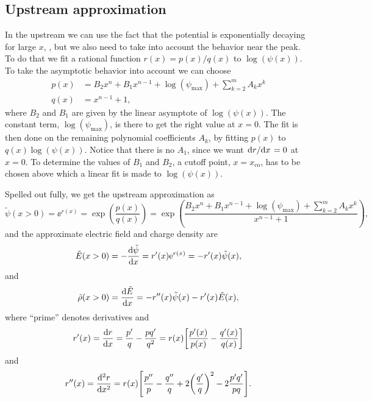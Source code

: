 \documentclass[11pt,a4paper, 
swedish, english %
]{article}
\begin{document}
\subsection{Upstream approximation}
In the upstream we can use the fact that the potential is
exponentially decaying for large $x$, , but we
also need to take into account the behavior near the peak.
To do that we fit a rational function $r(x)=p(x)/q(x)$ to
$\log(\psi(x))$. To take the asymptotic behavior into account we can
choose
\begin{equation}\label{eq:pq}
\begin{aligned}
p(x)&= B_2x^n+B_1x^{n-1} + \log(\psi_{\max}) + \sum_{k=2}^{m}A_kx^k\\
q(x)&= x^{n-1}+1,
\end{aligned}
\end{equation}
where $B_2$ and $B_1$ are given by the linear asymptote of
$\log(\psi(x))$. The constant term, $\log(\psi_{\max})$, is there to
get the right value at $x=0$. The fit is then done on the remaining
polynomial coefficients $A_k$, by fitting $p(x)$ to
$q(x)\log(\psi(x))$. Notice that there is no $A_1$, since we 
want $\dv*{r}{x}=0$ at $x=0$.
To determine the values of $B_1$ and $B_2$, a cutoff point,
$x=x_\text{co}$, has to be chosen above which a linear fit is made to
$\log(\psi(x))$. 

Spelled out fully, we get the upstream approximation as
\begin{equation}
\tilde\psi(x>0) = \ee^{r(x)}=\exp(\frac{p(x)}{q(x)})
=\exp(\frac{B_2x^n{+}B_1x^{n-1}{+}\log(\psi_{\max}) +
  \sum_{k=2}^{m}A_kx^k}
{x^{n-1}+1}),
\end{equation}
and the approximate electric field and charge density are
\begin{equation}
\tilde{E}(x>0) = -\dv{\tilde\psi}{x}=r'(x)\mathrm{e}^{r(x)}
= -r'(x)\tilde\psi(x),
\end{equation}
and
\begin{equation}
\tilde{\rho}(x>0) = \dv{\tilde{E}}{x}
=-r''(x)\tilde\psi(x)-r'(x)\tilde{E}(x),
\end{equation}
where ``prime'' denotes derivatives and
\begin{equation}
r'(x)=\dv{r}{x}
=\frac{p'}{q}-\frac{pq'}{q^2}
=r(x)\qty[\frac{p'(x)}{p(x)}-\frac{q'(x)}{q(x)}]
\end{equation}
and
\begin{equation}
r''(x)=\dv[2]{r}{x}
=r(x)\qty[\frac{p''}{p}-\frac{q''}{q}
+2\qty(\frac{q'}{q})^2-2\frac{p'q'}{pq}].
\end{equation}
\end{document}
